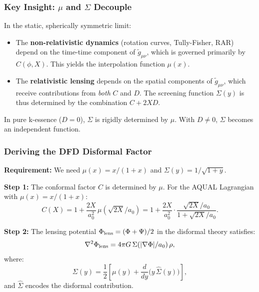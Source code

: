 \documentclass[11pt]{article}
\newcommand{\aM}{a_0}
\begin{document}
\subsubsection{Key Insight: $\mu$ and $\Sigma$ Decouple}

In the static, spherically symmetric limit:
\begin{itemize}
  \item The \textbf{non-relativistic dynamics} (rotation curves,
    Tully-Fisher, RAR) depend on the time-time component of
    $\tilde{g}_{\mu\nu}$, which is governed primarily by $C(\phi,X)$.
    This yields the interpolation function $\mu(x)$.

  \item The \textbf{relativistic lensing} depends on the spatial
    components of $\tilde{g}_{\mu\nu}$, which receive contributions
    from \emph{both} $C$ and $D$. The screening function $\Sigma(y)$
    is thus determined by the combination $C + 2XD$.
\end{itemize}

In pure k-essence ($D = 0$), $\Sigma$ is rigidly determined by $\mu$.
With $D \neq 0$, $\Sigma$ becomes an independent function.

\subsubsection{Deriving the DFD Disformal Factor}

\textbf{Requirement:} We need $\mu(x) = x/(1+x)$ and
$\Sigma(y) = 1/\sqrt{1+y}$.

\textbf{Step 1:} The conformal factor $C$ is determined by $\mu$.
For the AQUAL Lagrangian with $\mu(x) = x/(1+x)$:
\begin{equation}
  C(X) = 1 + \frac{2X}{\aM^2}\,\mu\!\left(\sqrt{2X}/\aM\right)
       = 1 + \frac{2X}{\aM^2} \cdot \frac{\sqrt{2X}/\aM}{1 + \sqrt{2X}/\aM}.
\end{equation}

\textbf{Step 2:} The lensing potential $\Phi_{\rm lens} = (\Phi + \Psi)/2$
in the disformal theory satisfies:
\begin{equation}
  \nabla^2 \Phi_{\rm lens} = 4\pi G\,\Sigma(|\nabla\Phi|/\aM)\,\rho,
\end{equation}
where:
\begin{equation}
  \Sigma(y) = \frac{1}{2}\left[\mu(y) + \frac{d}{dy}\bigl(y\,\hat{\Sigma}(y)\bigr)\right],
\end{equation}
and $\hat{\Sigma}$ encodes the disformal contribution.
\end{document}
